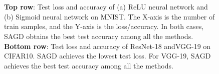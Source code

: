 \documentclass[11pt]{article}
\begin{document}
\begin{figure}[t]
\mbox{
 }



 \mbox{
 }
 \vspace{-0.1in}
 \caption[]{ \textbf{Top row}: Test loss and accuracy of (a) ReLU neural network and (b) Sigmoid neural network on MNIST. The X-axis is the number of train samples, and the Y-axis is the loss/accuracy. In both cases, \textsc{SAGD} obtains the best test accuracy among all the methods.
\textbf{Bottom row}: Test loss and accuracy of ResNet-18 andVGG-19 on CIFAR10. \textsc{SAGD} achieves the lowest test loss. For VGG-19, \textsc{SAGD} achieves the best test accuracy among all the methods. } 
 \label{fig:mnist}\vspace{-0.15in}
\end{figure}
\end{document}
